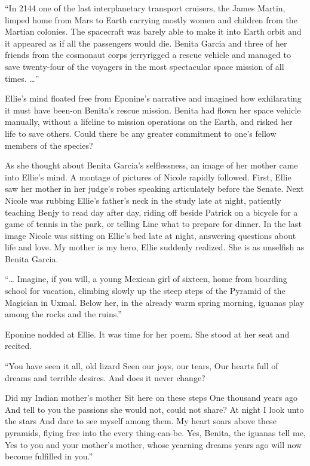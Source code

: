 \documentclass[]{article}
\begin{document}
{“In 2144 one of the last interplanetary transport cruisers, the James Martin, limped home from Mars to Earth carrying mostly women and children from the Martian colonies. The spacecraft was barely able to make it into Earth orbit and it appeared as if all the passengers would die. Benita Garcia and three of her friends from the cosmonaut corps jerryrigged a rescue vehicle and managed to save twenty-four of the voyagers in the most spectacular space mission of all times. …”

Ellie’s mind floated free from Eponine’s narrative and imagined how exhilarating it must have been-on Benita’s rescue mission. Benita had flown her space vehicle manually, without a lifeline to mission operations on the Earth, and risked her life to save others. Could there be any greater commitment to one’s fellow members of the species?

As she thought about Benita Garcia’s selflessness, an image of her mother came into Ellie’s mind. A montage of pictures of Nicole rapidly followed. First, Ellie saw her mother in her judge’s robes speaking articulately before the Senate. Next Nicole was rubbing Ellie’s father’s neck in the study late at night, patiently teaching Benjy to read day after day, riding off beside Patrick on a bicycle for a game of tennis in the park, or telling Line what to prepare for dinner. In the last image Nicole was sitting on Ellie’s bed late at night, answering questions about life and love. My mother is my hero, Ellie suddenly realized. She is as unselfish as Benita Garcia.

“… Imagine, if you will, a young Mexican girl of sixteen, home from boarding school for vacation, climbing slowly up the steep steps of the Pyramid of the Magician in Uxmal. Below her, in the already warm spring morning, iguanas play among the rocks and the ruins.”

Eponine nodded at Ellie. It was time for her poem. She stood at her seat and recited.

“You have seen it all, old lizard Seen our joys, our tears, Our hearts full of dreams and terrible desires. And does it never change?

Did my Indian mother’s mother Sit here on these steps One thousand years ago And tell to you the passions she would not, could not share? At night I look unto the stars And dare to see myself among them. My heart soars above these pyramids, flying free into the every thing-can-be. Yes, Benita, the iguanas tell me, Yes to you and your mother’s mother, whose yearning dreams years ago will now become fulfilled in you.”

}
\end{document}
